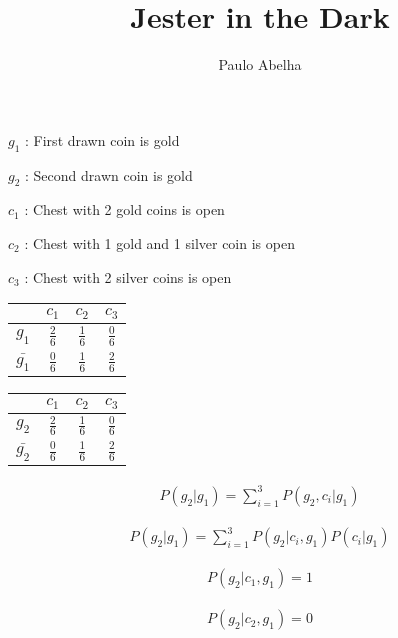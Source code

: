 \documentclass[12pt]{article}
\begin{document}
 

\pagecolor{blogger-black}
\color{white} 
 
\title{Jester in the Dark}
\author{Paulo Abelha}
\maketitle

$g_1$ : First drawn coin is gold

$g_2$ : Second drawn coin is gold

$c_1$ : Chest with 2 gold coins is open

$c_2$ : Chest with 1 gold and 1 silver coin is open

$c_3$ : Chest with 2 silver coins is open

\begin{tabular}{|c|c|c|c|}
\cline{2-4}
\multicolumn{1}{c|}{} & $c_1$ & $c_2$ & $c_3$ \\
\hline
$g_1$ & $\frac{2}{6}$ & $\frac{1}{6}$ & $\frac{0}{6}$ \\
\hline
$\bar{g_1}$ & $\frac{0}{6}$ & $\frac{1}{6}$ & $\frac{2}{6}$  \\
\hline
\end{tabular}
\begin{tabular}{|c|c|c|c|}
\cline{2-4}
\multicolumn{1}{c|}{} & $c_1$ & $c_2$ & $c_3$ \\
\hline
$g_2$ & $\frac{2}{6}$ & $\frac{1}{6}$ & $\frac{0}{6}$ \\
\hline
$\bar{g_2}$ & $\frac{0}{6}$ & $\frac{1}{6}$ & $\frac{2}{6}$  \\
\hline
\end{tabular}

\begin{gather}
P(g_2|g_1) = \sum_{i=1}^{3} P(g_2,c_i|g_1)
\end{gather}

\begin{gather}
P(g_2|g_1) = \sum_{i=1}^{3} P(g_2|c_i,g_1) P(c_i|g_1)
\end{gather}

\begin{gather}
P(g_2|c_1,g_1) = 1
\end{gather}

\begin{gather}
P(g_2|c_2,g_1) = 0
\end{gather}
\end{document}
